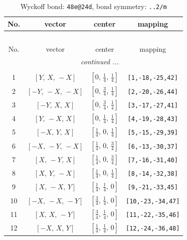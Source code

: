 \documentclass[fleqn,8pt]{jsarticle}
\begin{document}
\renewcommand{\arraystretch}{1.2}
\begin{longtable}{cccc}
\caption{Wyckoff bond: {\tt 48e@24d}, bond symmetry: {\tt ..2/m}}
 \\
 \hline \hline
No. & vector & center & mapping \\ \hline \endfirsthead

\multicolumn{3}{l}{\tablename\ \thetable{}} \\
 \hline \hline
No. & vector & center & mapping \\ \hline \endhead

 \hline \hline
\multicolumn{3}{r}{\footnotesize\it continued ...} \\ \endfoot

 \hline \hline
\multicolumn{3}{r}{} \\ \endlastfoot

1 & $\left[ Y,\, X,\, - X \right]$ & $\left[ 0,\, \frac{1}{4},\, \frac{1}{4} \right]$ & {\tt [1,-18,-25,42]} \\ \hline
2 & $\left[ - Y,\, - X,\, - X \right]$ & $\left[ 0,\, \frac{3}{4},\, \frac{1}{4} \right]$ & {\tt [2,-20,-26,44]} \\ \hline
3 & $\left[ - Y,\, X,\, X \right]$ & $\left[ 0,\, \frac{3}{4},\, \frac{1}{4} \right]$ & {\tt [3,-17,-27,41]} \\ \hline
4 & $\left[ Y,\, - X,\, X \right]$ & $\left[ 0,\, \frac{1}{4},\, \frac{1}{4} \right]$ & {\tt [4,-19,-28,43]} \\ \hline
5 & $\left[ - X,\, Y,\, X \right]$ & $\left[ \frac{1}{4},\, 0,\, \frac{1}{4} \right]$ & {\tt [5,-15,-29,39]} \\ \hline
6 & $\left[ - X,\, - Y,\, - X \right]$ & $\left[ \frac{1}{4},\, 0,\, \frac{3}{4} \right]$ & {\tt [6,-13,-30,37]} \\ \hline
7 & $\left[ X,\, - Y,\, X \right]$ & $\left[ \frac{1}{4},\, 0,\, \frac{3}{4} \right]$ & {\tt [7,-16,-31,40]} \\ \hline
8 & $\left[ X,\, Y,\, - X \right]$ & $\left[ \frac{1}{4},\, 0,\, \frac{1}{4} \right]$ & {\tt [8,-14,-32,38]} \\ \hline
9 & $\left[ X,\, - X,\, Y \right]$ & $\left[ \frac{1}{4},\, \frac{1}{4},\, 0 \right]$ & {\tt [9,-21,-33,45]} \\ \hline
10 & $\left[ - X,\, - X,\, - Y \right]$ & $\left[ \frac{3}{4},\, \frac{1}{4},\, 0 \right]$ & {\tt [10,-23,-34,47]} \\ \hline
11 & $\left[ X,\, X,\, - Y \right]$ & $\left[ \frac{3}{4},\, \frac{1}{4},\, 0 \right]$ & {\tt [11,-22,-35,46]} \\ \hline
12 & $\left[ - X,\, X,\, Y \right]$ & $\left[ \frac{1}{4},\, \frac{1}{4},\, 0 \right]$ & {\tt [12,-24,-36,48]} \\
\end{longtable}
\end{document}

